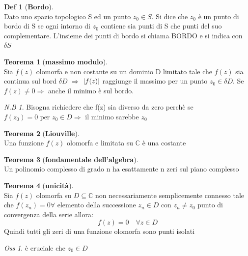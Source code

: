 \documentclass[a4paper,11pt]{report}
\theoremstyle{remark}
\newtheorem*{oss}{Oss}
\newtheorem*{nb}{N.B}
\theoremstyle{definition}
\newtheorem*{teo}{Teorema}
\newtheorem*{Def}{Def}
\DeclarePairedDelimiter{\abs}{\lvert}{\rvert}
\begin{document}
	\begin{Def}[\textbf{Bordo}]\hfil\\
		Dato uno spazio topologico S ed un punto $z_0 \in S$. Si dice che $z_0$ è un punto di bordo di S se ogni intorno di $z_0$ contiene sia punti di S che punti del suo complementare. \newline
		L'insieme dei punti di bordo si chiama BORDO e si indica con $\delta S$
	\end{Def}

	\begin{teo}[\textbf{massimo modulo}]\hfill\\
		Sia $f(z)$ olomorfa e non costante su un dominio D limitato tale che $f(z)$ sia continua sul bord $\delta D$ \newline $\Rightarrow$ $\abs{f(z)}$ raggiunge il massimo per un punto $z_0 \in \delta D$. Se $f(z) \neq 0 \Rightarrow$ anche il minimo è sul bordo.
	\end{teo}

	\begin{nb}
		Bisogna richiedere che f(z) sia diverso da zero perchè se $f(z_0) = 0 \mbox{ per } z_0 \in D \Rightarrow$ il minimo sarebbe $z_0$
	\end{nb}

	\begin{teo}[\textbf{Liouville}]\hfil\\
		Una funzione $f(z)$ olomorfa e limitata su $\mathbb{C}$ è una costante
	\end{teo}

	\begin{teo}[\textbf{fondamentale dell'algebra}]\hfil\\
		Un polinomio complesso di grado n ha esattamente n zeri sul piano complesso
	\end{teo}

	\begin{teo}[\textbf{unicità}]\hfil\\
		Sia $f(z)$ olomorfa su $D \subseteq \mathbb{C}$ non necessariamente semplicemente connesso tale che $f(z_n)=0 \forall$ elemento della successione ${z_n} \in D \mbox{ con } z_n \neq z_0$ punto di convergenza della serie allora:
		\[f(z)=0 \quad \forall z \in D\]
		Quindi tutti gli zeri di una funzione olomorfa sono punti isolati
	\end{teo}

	\begin{oss}
		è cruciale che $z_0 \in D$
	\end{oss}
\end{document}
